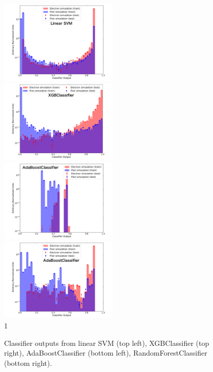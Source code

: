 \begin{figure}[!ht]
    \begin{center}  
    \includegraphics[width=0.5\textwidth]{Fig/fig_HGCAL/Classifier-output-2vars-SVM}~
    \includegraphics[width=0.5\textwidth]{Fig/fig_HGCAL/Classifier-output-2vars-XGBClassifier}\\
    \includegraphics[width=0.5\textwidth]{Fig/fig_HGCAL/Classifier-output-2vars-AdaBoost}~
    \includegraphics[width=0.5\textwidth]{Fig/fig_HGCAL/Classifier-output-2vars-RandomForest}\\1
    \caption{Classifier outputs from linear SVM (top left), XGBClassifier (top right), AdaBoostClassifier (bottom left), RandomForestClassifier (bottom right).}
    \label{fig:Classifier-Output}
    \end{center}
\end{figure}

